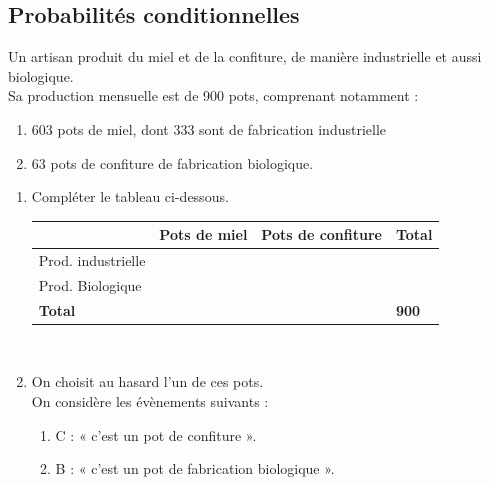 \documentclass[a4paper,11pt,exos]{nsi} %
\begin{document}
\subsection*{ Probabilités conditionnelles}


Un artisan produit du miel et de la confiture, de manière industrielle et aussi biologique.\\
Sa production mensuelle est de 900 pots, comprenant notamment :
\begin{enumerate}[label=\textbullet]
	\item 	603 pots de miel, dont 333 sont de fabrication industrielle 
	\item 	63 pots de confiture de fabrication biologique.
\end{enumerate}
\begin{enumerate}
	\item 	Compléter le tableau ci-dessous.
	\begin{center}
		\begin{tabular}{|l|l|l|l|}
			\cline{2-4}
			\multicolumn{1}{l|}{} & Pots de miel & Pots de confiture & \textbf{Total} \\ 
			\hline
			Prod. industrielle &  &  &  \\ 
			\hline
			Prod. Biologique &  &  &  \\ 
			\hline
			\textbf{Total} &  &  &  \textbf{900}\\ 
			\hline
		\end{tabular}\\
	\end{center}
	\item	On choisit au hasard l'un de ces pots.\\
	On considère les évènements suivants :
	\begin{enumerate}[label=\textbullet]
		\item 	C : « c'est un pot de confiture ».
		\item 	B : « c'est un pot de fabrication biologique ».
	\end{enumerate} 
\end{enumerate} 
\end{document}
